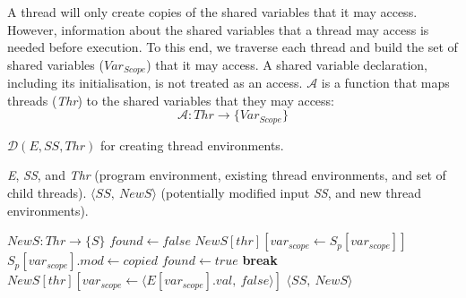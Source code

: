 A thread will only create copies of the shared variables that it may 
access. However, information about the shared variables that a thread 
may access is needed before execution. To this end, we traverse each 
thread and build the set of shared variables ($Var_{Scope}$) that it 
may access. A shared variable declaration, including its initialisation, 
is not treated as an access. $\mathcal{A}$ is a function that maps threads 
(\emph{Thr}) to the shared variables that they may access:
\begin{equation*}
	\mathcal{A}: Thr \to \{Var_{Scope}\}
\end{equation*}

\begin{algorithm}[t]
	\caption{$\mathcal{D}(E, SS, Thr)$ for creating thread environments.}
	\label{algo:aux_D}

	\begin{algorithmic}[1]
		\Require \emph{E}, \emph{SS}, and \emph{Thr} 
				 (program environment, existing thread environments, and set of child threads).
		\Ensure $\langle SS,~NewS \rangle$ (potentially modified input \emph{SS}, and new thread environments).

		\State $NewS: Thr \to \{S\}$
			\label{algo:aux_D_each_thread1}
			 \label{algo:aux_D_each_var1}
				\State $found \gets false$
					\label{algo:aux_D_each_p1}
						\State $NewS[thr][var_{scope} \gets S_p[var_{scope}]]$	\label{algo:aux_D_found1}
						\State $S_p[var_{scope}].mod \gets copied$	\label{algo:aux_D_found2}
						\State $found \gets true$
						\State \textbf{break}
					\EndIf
				\EndFor	\label{algo:aux_D_each_p2}
				\If{$\lnot found \land var_{scope} \in E$}
					\State $NewS[thr][var_{scope} \gets \langle E[var_{scope}].val,~false \rangle ]$	\label{algo:aux_D_from_E}
				\EndIf
			\EndFor	\label{algo:aux_D_each_var2}
		\EndFor	\label{algo:aux_D_each_thread2}
		\State \Return $\langle SS,~NewS \rangle$
	\end{algorithmic}
\end{algorithm}

